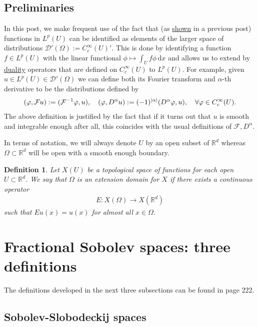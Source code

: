 \documentclass[
    a4paper,
    DIV=14,
    abstract=true,
    numbers=noenddot
]
{scrartcl}
\newtheorem{definition}[theorem]{Definition}
\theoremstyle{definition}
\renewcommand{\d}{\,\mathrm{d}}\newcommand{\dx}{\,\mathrm{d}x}
\newcommand{\R}{\mathbb{R}}
\newcommand{\Dd}{\mathcal{D}}
\newcommand{\Ff}{\mathcal{F}}
\begin{document}
\subsection{Preliminaries}
In this post, we make frequent use of the fact that (as \href{https://nowheredifferentiable.com/2023-07-12-PDEs-3-Sobolev_spaces/#:~:text=we%20would%20like%20to%20see%20what%20some%20of%20them%20look%20like.}{shown} in a previous post) functions in $L^p(U)$ can be identified as elements of the larger space of distributions $\Dd '(\Omega ):= C_c^\infty(U)'$. This is done by identifying a function $f \in L^p(U)$ with the linear functional $\phi \mapsto \int_U f\phi \d x$ and allows us to extend by \href{https://nowheredifferentiable.com/2023-01-29-PDE-1-Fourier/#:~:text=is%20called%20the-,duality,-method%20and%20appears}{duality} operators that are defined on $C_c^\infty(U)$ to $L^p(U)$. For example, given $u \in L^p(U) \in \Dd'(\Omega )$ we can define both its Fourier transform and  $\alpha$-th derivative to be the distributions defined by
\begin{align*}
    (\varphi ,\Ff u):=(\Ff^{-1}\varphi ,u),\quad (\varphi ,D^\alpha u):=(-1)^{\abs{\alpha}}(D^\alpha \varphi ,u), \quad \forall \varphi \in C_c^\infty(U).
\end{align*}
The above definition is justified by the fact that if it turns out that $u$ is smooth and integrable enough after all, this coincides with the usual definitions of $\Ff, D^\alpha$.

In terms of notation, we will always denote $U$ by an open subset of $\R^d$  whereas $\Omega \subset \R^d $ will be open with a smooth enough boundary.
\begin{definition}
    Let $X(U)$ be a topological space of functions for each open $U \subset \R^d$.
    We say that $\Omega $ is an extension domain for $X$ if there exists a continuous operator
    \begin{align*}
        E: X(\Omega ) \to X(\R^d)
    \end{align*}
    such that  $Eu(x)=u(x)$  for almost all $x \in \Omega $.
\end{definition}



\section{Fractional Sobolev spaces: three definitions}
The definitions developed in the next three subsections can be found in \cite{agranovich2015sobolev} page 222.
\subsection{Sobolev-Slobodeckij spaces}
\end{document}

